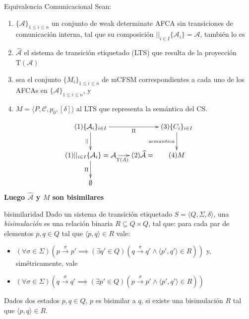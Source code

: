 \documentclass[10pt,xcolor={table,dvipsnames},t]{beamer}
\newcommand{\Tau}{\mathrm{T}}
\begin{document}
\begin{frame}{Equivalencia Comunicacional}
Sean:
\begin{enumerate}
\item $\{\mathcal{A}\}_{1 \leq i \leq n}$ un conjunto de weak determinate AFCA sin transiciones de comunicación interna, tal que su composición $||_{i \in I}\{\mathcal{A}_i\}= \mathcal{A}$, también lo es
\item $\widehat{\mathcal{A}}$ el sistema de transición etiquetado (LTS) que resulta de la proyección $\Tau(\mathcal{A})$
\item sea el conjunto $\{M_i\}_{1 \leq i \leq n}$ de mCFSM correspondientes a cada uno de los AFCAs en $\{\mathcal{A}\}_{1 \leq i \leq n}$, y
\item $M = \langle P, \mathcal{C}, {p_0}, [\delta] \rangle$ al LTS que representa la semántica del CS.
\end{enumerate}
$$
\xymatrix@C=0.5em{
	(1)\{\mathcal{A}_i\}_{i \in I} \ar[rrr]_{\Pi} \ar[d]_{||} & & & (3)\{C_i\}_{i \in I}  \ar[d]_{semantica}  \\
	  {(1)||_{i \in I}\{\mathcal{A}_i\}= \mathcal{A}} \ar[rr]_{\ \ \ \ \ \Tau(A)} \ar[d]_{\Pi} & &  (2)\widehat{\mathcal{A}} =& (4) M  \\
	  \emptyset
}
$$
\textbf{Luego $\widehat{\mathcal{A}}$ y $M$ son bisimilares}

\end{frame}

\begin{frame}{bisimilaridad}
\vspace{\fill}
Dado un sistema de transición etiquetado $ S = \langle Q, \Sigma, \delta \rangle $, una \emph{bisimulación} es una relación binaria $R \subseteq Q \times Q$, tal que: para cada par de elementos $p, q \in Q$ tal que $\langle p, q \rangle \in R$ vale:
\begin{itemize}
    \item $(\forall \sigma \in \Sigma)(p \xrightarrow{\sigma} p' \implies (\exists q' \in Q)(q \xrightarrow{\sigma} q' \land \langle p', q' \rangle \in R))$ y, simétricamente, vale 
    \item $(\forall \sigma \in \Sigma)(q \xrightarrow{\sigma} q' \implies (\exists p' \in Q)(p \xrightarrow{\sigma} p' \land \langle p', q' \rangle \in R))$
\end{itemize}
Dados dos estados $p, q \in Q $, $p$ es bisimilar a $q$, si existe una bisimulación $R$ tal que $\langle p, q \rangle \in R$.
\vspace{\fill}
\end{frame}
\end{document}
